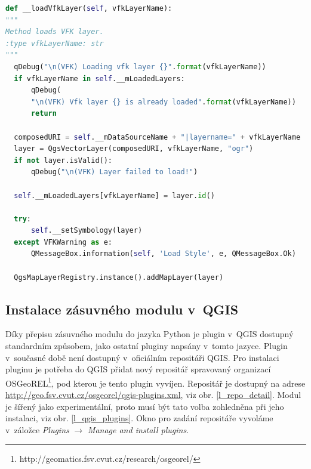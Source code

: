 \documentclass[a4paper,12pt,oneside]{book}
\begin{document}
\newpage
\begin{lstlisting}[language=Python, 
		    caption=Kód pro načtení vektorové vrstvy v~jazyce Python, 
		    keywordstyle=\color{blue}\ttfamily,
		    stringstyle=\color{red}\ttfamily,
		    commentstyle=\color{green}\ttfamily, morekeywords={qDebug,QString,QgsVectorLayer,QgsMapLayerRegistry,QMessageBox,self},
		    label=l_loadLayerPython]
def __loadVfkLayer(self, vfkLayerName):
"""
Method loads VFK layer.
:type vfkLayerName: str
"""
  qDebug("\n(VFK) Loading vfk layer {}".format(vfkLayerName))
  if vfkLayerName in self.__mLoadedLayers:
      qDebug(
	  "\n(VFK) Vfk layer {} is already loaded".format(vfkLayerName))
      return

  composedURI = self.__mDataSourceName + "|layername=" + vfkLayerName
  layer = QgsVectorLayer(composedURI, vfkLayerName, "ogr")
  if not layer.isValid():
      qDebug("\n(VFK) Layer failed to load!")

  self.__mLoadedLayers[vfkLayerName] = layer.id()

  try:
      self.__setSymbology(layer)
  except VFKWarning as e:
      QMessageBox.information(self, 'Load Style', e, QMessageBox.Ok)

  QgsMapLayerRegistry.instance().addMapLayer(layer)
\end{lstlisting}

\subsection{Instalace zásuvného modulu v~QGIS}
Díky přepisu zásuvného modulu do jazyka Python je plugin v~QGIS dostupný standardním způsobem, jako ostatní pluginy napsány v~tomto jazyce. Plugin v~současné době není dostupný v~oficiálním repositáři QGIS. Pro instalaci pluginu je potřeba do QGIS přidat nový repositář spravovaný organizací OSGeoREL\footnote{http://geomatics.fsv.cvut.cz/research/osgeorel/}, pod kterou je tento plugin vyvíjen. Repositář je dostupný na adrese \url{http://geo.fsv.cvut.cz/osgeorel/qgis-plugins.xml}, viz obr. \ref{l_repo_detail}. Modul je šířený jako experimentální, proto musí být tato volba zohledněna při jeho instalaci, viz obr. \ref{l_qgis_plugins}. Okno pro zadání repositáře vyvoláme v~záložce \textit{Plugins} $\rightarrow$ \textit{Manage and install plugins}.
\end{document}
